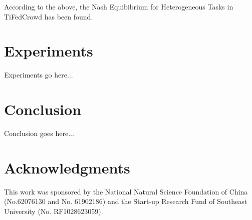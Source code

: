 \documentclass[final,1p,times]{elsarticle}
\begin{document}
According to the above, the Nash Equibibrium for Heterogeneous Tasks in TiFedCrowd has been found.

\section{Experiments} \label{sec:exp}
Experiments go here...
\section{Conclusion} \label{sec:con}
Conclusion goes here...

\section*{Acknowledgments}
This work was sponsored by the National Natural Science Foundation of China (No.62076130 and No. 61902186) and the Start-up Research Fund of Southeast University (No. RF1028623059).


\end{document}
